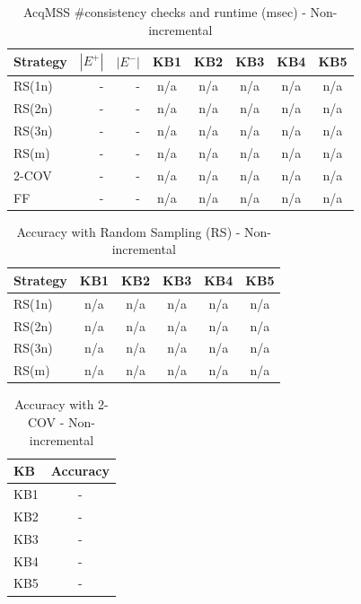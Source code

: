 \begin{table}[htbp]
\centering
\caption{AcqMSS \#consistency checks and runtime (msec) - Non-incremental}
\label{tab:table7_non-incremental}
\begin{tabular}{lrrccccc}
\toprule
Strategy & $|E^+|$ & $|E^-|$ & KB1 & KB2 & KB3 & KB4 & KB5 \\
\midrule
RS(1n) & - & - & n/a & n/a & n/a & n/a & n/a \\
RS(2n) & - & - & n/a & n/a & n/a & n/a & n/a \\
RS(3n) & - & - & n/a & n/a & n/a & n/a & n/a \\
RS(m) & - & - & n/a & n/a & n/a & n/a & n/a \\
2-COV & - & - & n/a & n/a & n/a & n/a & n/a \\
FF & - & - & n/a & n/a & n/a & n/a & n/a \\
\bottomrule
\end{tabular}
\end{table}

\begin{table}[htbp]
\centering
\caption{Accuracy with Random Sampling (RS) - Non-incremental}
\label{tab:table9_non-incremental}
\begin{tabular}{lccccc}
\toprule
Strategy & KB1 & KB2 & KB3 & KB4 & KB5 \\
\midrule
RS(1n) & n/a & n/a & n/a & n/a & n/a \\
RS(2n) & n/a & n/a & n/a & n/a & n/a \\
RS(3n) & n/a & n/a & n/a & n/a & n/a \\
RS(m) & n/a & n/a & n/a & n/a & n/a \\
\bottomrule
\end{tabular}
\end{table}

\begin{table}[htbp]
\centering
\caption{Accuracy with 2-COV - Non-incremental}
\label{tab:table10_non-incremental}
\begin{tabular}{lc}
\toprule
KB & Accuracy \\
\midrule
KB1 & - \\
KB2 & - \\
KB3 & - \\
KB4 & - \\
KB5 & - \\
\bottomrule
\end{tabular}
\end{table}

